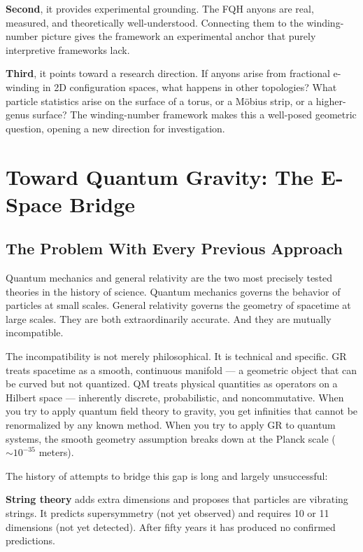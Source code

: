\documentclass[aps,prd,preprint,superscriptaddress,longbibliography,floatfix]{revtex4-2}
\theoremstyle{remark}
\begin{document}
\textbf{Second}, it provides experimental grounding. The FQH anyons are real, measured, and theoretically well-understood. Connecting them to the winding-number picture gives the framework an experimental anchor that purely interpretive frameworks lack.

\textbf{Third}, it points toward a research direction. If anyons arise from fractional e-winding in 2D configuration spaces, what happens in other topologies? What particle statistics arise on the surface of a torus, or a M\"{o}bius strip, or a higher-genus surface? The winding-number framework makes this a well-posed geometric question, opening a new direction for investigation.



\section{Toward Quantum Gravity: The E-Space Bridge}



\subsection{The Problem With Every Previous Approach}

Quantum mechanics and general relativity are the two most precisely tested theories in the history of science. Quantum mechanics governs the behavior of particles at small scales. General relativity governs the geometry of spacetime at large scales. They are both extraordinarily accurate. And they are mutually incompatible.

The incompatibility is not merely philosophical. It is technical and specific. GR treats spacetime as a smooth, continuous manifold --- a geometric object that can be curved but not quantized. QM treats physical quantities as operators on a Hilbert space --- inherently discrete, probabilistic, and noncommutative. When you try to apply quantum field theory to gravity, you get infinities that cannot be renormalized by any known method. When you try to apply GR to quantum systems, the smooth geometry assumption breaks down at the Planck scale ($\sim 10^{-35}$ meters).

The history of attempts to bridge this gap is long and largely unsuccessful:

\textbf{String theory} adds extra dimensions and proposes that particles are vibrating strings. It predicts supersymmetry (not yet observed) and requires 10 or 11 dimensions (not yet detected). After fifty years it has produced no confirmed predictions.
\end{document}
